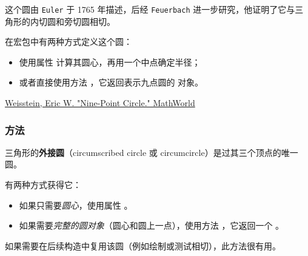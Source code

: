 这个圆由 \texttt{Euler} 于 1765 年描述，后经 \texttt{Feuerbach} 进一步研究，他证明了它与三角形的内切圆和旁切圆相切。

\medskip

在宏包中有两种方式定义这个圆：
\begin{itemize}
  \item 使用属性  计算其圆心，再用一个中点确定半径；
  \item 或者直接使用方法 ，它返回表示九点圆的  对象。
\end{itemize}
\begin{flushright}
\small
\href{[URL1]}{Weisstein, Eric W. "Nine-Point Circle." MathWorld}
\end{flushright}

\vspace{1em}
\begin{tkzexample}[latex=.5\textwidth]
\begin{center}
\end{center}
\end{tkzexample}

\subsubsection{方法 } %
\label{ssub:method_triangle_circum_circle}

三角形的\textbf{外接圆}（circumscribed circle 或 circumcircle）是过其三个顶点的唯一圆。

\medskip

有两种方式获得它：
\begin{itemize}
  \item 如果只需要\emph{圆心}，使用属性 。
  \item 如果需要\emph{完整的圆对象}（圆心和圆上一点），使用方法 ，它返回一个 。
\end{itemize}


如果需要在后续构造中复用该圆（例如绘制或测试相切），此方法很有用。

